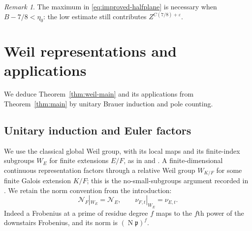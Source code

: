 \documentclass[11pt,a4paper]{article}
\numberwithin{equation}{section}
\theoremstyle{definition}
\theoremstyle{remark}
\newtheorem{remark}[theorem]{Remark}
\newcommand{\eps}{\varepsilon}
\newcommand{\Norm}{\operatorname{N}}
\begin{document}
\begin{remark}
The maximum in \eqref{eq:improved-halfplane} is necessary when
$B-7/8<\eta_0$: the low estimate still contributes
$Z^{C(7/8)+\eps}$.  
\end{remark}

\section{Weil representations and applications}\label{sec:weil}

We deduce Theorem~\ref{thm:weil-main} and its applications from
Theorem~\ref{thm:main} by unitary Brauer induction and pole counting.

\subsection{Unitary induction and Euler factors}\label{subsec:unitary-induction}

We use the classical global Weil group, with its local maps and its
finite-index subgroups $W_E$ for finite extensions $E/F$, as in
\cite[Chapters~1--2]{Langlands} and
\cite[Section~3.1]{Johansson}.    A finite-dimensional continuous representation
factors through a relative Weil group $W_{K/F}$ for some finite
Galois extension $K/F$; this is the no-small-subgroups argument recorded
in \cite[proof of Proposition~7]{Johansson}.  We retain the norm
convention from the introduction:
\begin{equation}\label{eq:weil-norm-compatibility}
 \mathcal N_F|_{W_E}=\mathcal N_E,\qquad
 \nu_{F,t}|_{W_E}=\nu_{E,t}.
\end{equation}
Indeed a Frobenius at a prime of residue degree $f$ maps to the
$f$th power of the downstairs Frobenius, and its norm is
$(\Norm\mathfrak p)^f$.  
\end{document}
